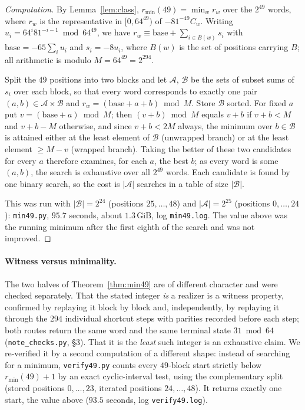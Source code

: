 \documentclass[11pt,a4paper]{article}
\theoremstyle{plain}
\theoremstyle{definition}
\theoremstyle{remark}
\begin{document}
\begin{proof}[Computation]
By Lemma~\ref{lem:class}, $r_{\min}(49)=\min_w r_w$ over the $2^{49}$ words,
where $r_w$ is the representative in $[0,64^{49})$ of
$-81^{-49}C_w$. Writing $u_i=64^{i}81^{-i-1}\bmod 64^{49}$, we have
$r_w\equiv \mathrm{base}+\sum_{i\in B(w)}s_i$ with
$\mathrm{base}=-65\sum_i u_i$ and $s_i=-8u_i$, where $B(w)$ is the set of
positions carrying $B$; all arithmetic is modulo $M=64^{49}=2^{294}$.

Split the $49$ positions into two blocks and let $\mathcal{A}$, $\mathcal{B}$
be the sets of subset sums of $s_i$ over each block, so that every word
corresponds to exactly one pair $(a,b)\in\mathcal{A}\times\mathcal{B}$ and
$r_w=(\mathrm{base}+a+b)\bmod M$. Store $\mathcal{B}$ sorted. For fixed $a$
put $v=(\mathrm{base}+a)\bmod M$; then $(v+b)\bmod M$ equals $v+b$ if
$v+b<M$ and $v+b-M$ otherwise, and since $v+b<2M$ always, the minimum over
$b\in\mathcal{B}$ is attained either at the least element of $\mathcal{B}$
(unwrapped branch) or at the least element $\ge M-v$ (wrapped branch). Taking
the better of these two candidates for every $a$ therefore examines, for each
$a$, the best $b$; as every word is some $(a,b)$, the search is exhaustive over
all $2^{49}$ words. Each candidate is found by one binary search, so the cost
is $|\mathcal{A}|$ searches in a table of size $|\mathcal{B}|$.

This was run with $|\mathcal{B}|=2^{24}$ (positions $25,\dots,48$) and
$|\mathcal{A}|=2^{25}$ (positions $0,\dots,24$): \texttt{min49.py}, $95.7$
seconds, about $1.3$\,GiB, log \texttt{min49.log}. The value above was the
running minimum after the first eighth of the search and was not improved.
\end{proof}

\paragraph{Witness versus minimality.} The two halves of
Theorem~\ref{thm:min49} are of different character and were checked
separately. That the stated integer \emph{is} a realizer is a witness
property, confirmed by replaying it block by block and, independently, by
replaying it through the $294$ individual shortcut steps with parities recorded
before each step; both routes return the same word and the same terminal state
$31\bmod 64$ (\texttt{note\_checks.py}, \S3). That it is the \emph{least} such
integer is an exhaustive claim. We re-verified it by a second computation of a
different shape: instead of searching for a minimum, \texttt{verify49.py}
counts every $49$-block start strictly below $r_{\min}(49)+1$ by an exact
cyclic-interval test, using the complementary split (stored positions
$0,\dots,23$, iterated positions $24,\dots,48$). It returns exactly one start,
the value above ($93.5$ seconds, log \texttt{verify49.log}).
\end{document}
